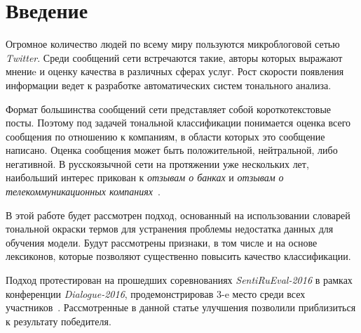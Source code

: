 \section{Введение}
Огромное количество людей по всему миру пользуются микроблоговой сетью
{\it Twitter}.
Среди сообщений сети встречаются такие, авторы которых выражают мнениe и оценку
качества в различных сферах услуг.
Рост скорости появления информации ведет к разработке автоматических систем
тонального анализа.

Формат большинства сообщений сети представляет собой короткотекстовые посты.
Поэтому под задачей тональной классификации понимается оценка всего
сообщения по отношению к компаниям, в области которых это сообщение написано.
Оценка сообщения может быть положительной, нейтральной, либо негативной.
В русскоязычной сети на протяжении уже нескольких лет, наибольший интерес прикован к
{\it отзывам о банках} и {\it отзывам о телекоммуникационных компаниях}~\cite{tonalityAnalysis}.

В этой работе будет рассмотрен подход, основанный на использовании
словарей тональной окраски термов для устранения проблемы недостатка
данных для обучения модели.
Будут рассмотрены признаки, в том числе и на основе лексиконов, которые позволяют
существенно повысить качество классификации.

Подход протестирован на прошедших соревнованиях {\it SentiRuEval-2016}
в рамках конференции {\it Dialogue-2016},
продемонстрировав 3-e место среди всех участников~\cite{dialog2016}.
Рассмотренные в данной статье улучшения позволили приблизиться к результату
победителя.
